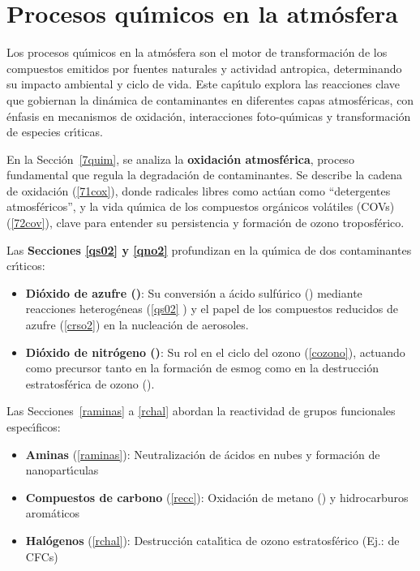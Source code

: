 %
\chapter[Procesos Qu\'{\i}micos en la Atm\'osfera]{Procesos qu\'{\i}micos en la atm\'osfera}

Los procesos qu\'{\i}micos en la atm\'osfera son el motor de transformaci\'on de los compuestos emitidos por fuentes naturales y actividad \gls{antropica}, determinando su impacto ambiental y ciclo de vida. Este cap\'{\i}tulo explora las reacciones clave que gobiernan la din\'amica de contaminantes en diferentes capas atmosf\'ericas, con \'enfasis en mecanismos de oxidaci\'on, interacciones foto-qu\'{\i}micas y transformaci\'on de especies cr\'{\i}ticas.

En la Secci\'on~\ref{7quim}, se analiza la \textbf{oxidaci\'on atmosf\'erica}, proceso fundamental que regula la degradaci\'on de contaminantes. Se describe la cadena de oxidaci\'on (\ref{71cox}), donde radicales libres como  act\'uan como ``detergentes atmosf\'ericos'', y la vida qu\'{\i}mica de los compuestos org\'anicos vol\'atiles (COVs) (\ref{72cov}), clave para entender su persistencia y formaci\'on de ozono troposf\'erico.

Las \textbf{Secciones \ref{qs02} y \ref{qno2}} profundizan en la qu\'{\i}mica de dos contaminantes cr\'{\i}ticos:
\begin{itemize}
    \item \textbf{Di\'oxido de azufre ()}: Su conversi\'on a \'acido sulf\'urico () mediante reacciones heterog\'eneas (\ref{qs02} ) y el papel de los compuestos reducidos de azufre (\ref{crso2}) en la nucleaci\'on de aerosoles.
    \item \textbf{Di\'oxido de nitr\'ogeno ()}: Su rol en el ciclo del ozono (\ref{cozono}), actuando como precursor tanto en la formaci\'on de esmog como en la destrucci\'on estratosf\'erica de ozono ().
\end{itemize}

Las Secciones~\ref{raminas} a  \ref{rchal} abordan la reactividad de grupos funcionales espec\'{\i}ficos:
\begin{itemize}
    \item \textbf{Aminas} (\ref{raminas}): Neutralizaci\'on de \'acidos en nubes y formaci\'on de nanopart\'{\i}culas
    \item \textbf{Compuestos de carbono} (\ref{recc}): Oxidaci\'on de metano () y hidrocarburos arom\'aticos
    \item \textbf{Hal\'ogenos} (\ref{rchal}): Destrucci\'on catal\'{\i}tica de ozono estratosf\'erico (Ej.:  de CFCs)
\end{itemize}


